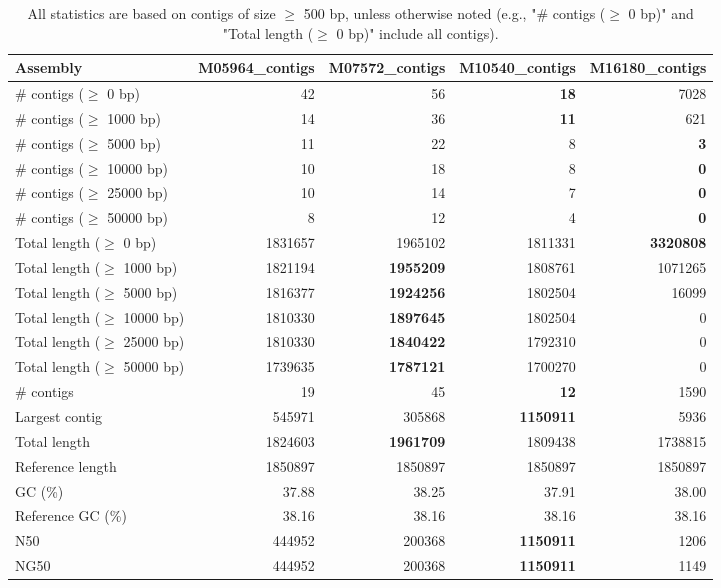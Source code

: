 \documentclass[12pt,a4paper]{article}
\begin{document}
\begin{table}[ht]
\begin{center}
\caption{All statistics are based on contigs of size $\geq$ 500 bp, unless otherwise noted (e.g., "\# contigs ($\geq$ 0 bp)" and "Total length ($\geq$ 0 bp)" include all contigs).}
\begin{tabular}{|l*{4}{|r}|}
\hline
Assembly & M05964\_contigs & M07572\_contigs & M10540\_contigs & M16180\_contigs \\ \hline
\# contigs ($\geq$ 0 bp) & 42 & 56 & {\bf 18} & 7028 \\ \hline
\# contigs ($\geq$ 1000 bp) & 14 & 36 & {\bf 11} & 621 \\ \hline
\# contigs ($\geq$ 5000 bp) & 11 & 22 & 8 & {\bf 3} \\ \hline
\# contigs ($\geq$ 10000 bp) & 10 & 18 & 8 & {\bf 0} \\ \hline
\# contigs ($\geq$ 25000 bp) & 10 & 14 & 7 & {\bf 0} \\ \hline
\# contigs ($\geq$ 50000 bp) & 8 & 12 & 4 & {\bf 0} \\ \hline
Total length ($\geq$ 0 bp) & 1831657 & 1965102 & 1811331 & {\bf 3320808} \\ \hline
Total length ($\geq$ 1000 bp) & 1821194 & {\bf 1955209} & 1808761 & 1071265 \\ \hline
Total length ($\geq$ 5000 bp) & 1816377 & {\bf 1924256} & 1802504 & 16099 \\ \hline
Total length ($\geq$ 10000 bp) & 1810330 & {\bf 1897645} & 1802504 & 0 \\ \hline
Total length ($\geq$ 25000 bp) & 1810330 & {\bf 1840422} & 1792310 & 0 \\ \hline
Total length ($\geq$ 50000 bp) & 1739635 & {\bf 1787121} & 1700270 & 0 \\ \hline
\# contigs & 19 & 45 & {\bf 12} & 1590 \\ \hline
Largest contig & 545971 & 305868 & {\bf 1150911} & 5936 \\ \hline
Total length & 1824603 & {\bf 1961709} & 1809438 & 1738815 \\ \hline
Reference length & 1850897 & 1850897 & 1850897 & 1850897 \\ \hline
GC (\%) & 37.88 & 38.25 & 37.91 & 38.00 \\ \hline
Reference GC (\%) & 38.16 & 38.16 & 38.16 & 38.16 \\ \hline
N50 & 444952 & 200368 & {\bf 1150911} & 1206 \\ \hline
NG50 & 444952 & 200368 & {\bf 1150911} & 1149 \\ \hline

\end{tabular}
\end{center}
\end{table}
\end{document}
